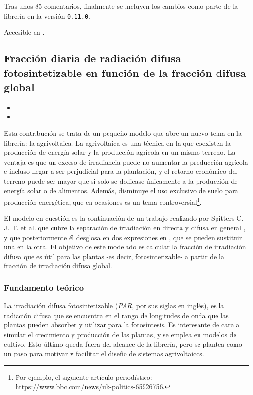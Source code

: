 Tras unos 85 comentarios, finalmente se incluyen los cambios como parte de la librería en la versión \texttt{0.11.0}.

Accesible en .

\subsection{Fracción diaria de radiación difusa fotosintetizable en función de la fracción difusa global}

\begin{itemize}
    \item {}
    \item {}
\end{itemize}

Esta contribución se trata de un pequeño modelo que abre un nuevo tema en la librería: la agrivoltaica. La agrivoltaica es una técnica en la que coexisten la producción de energía solar y la producción agrícola en un mismo terreno. La ventaja es que un exceso de irradiancia puede no aumentar la producción agrícola e incluso llegar a ser perjudicial para la plantación, y el retorno económico del terreno puede ser mayor que si solo se dedicase únicamente a la producción de energía solar o de alimentos. Además, disminuye el uso exclusivo de suelo para producción energética, que en ocasiones es un tema controversial\footnote{Por ejemplo, el siguiente artículo periodístico: \url{https://www.bbc.com/news/uk-politics-65926756}.}.

El modelo en cuestión es la continuación de un trabajo realizado por Spitters C. J. T. et al. que cubre la separación de irradiación en directa y difusa en general \cite{Spitters_Toussaint_Goudriaan_1986}, y que posteriormente él desglosa en dos expresiones en \cite{Spitters_1986}, que se pueden sustituir una en la otra. El objetivo de este modelado es calcular la fracción de irradiación difusa que es útil para las plantas -es decir, fotosintetizable- a partir de la fracción de irradiación difusa global.

\subsubsection{Fundamento teórico}

La irradiación difusa fotosintetizable (\textit{PAR}, por sus siglas en inglés), es la radiación difusa que se encuentra en el rango de longitudes de onda que las plantas pueden absorber y utilizar para la fotosíntesis. Es interesante de cara a simular el crecimiento y producción de las plantas, y se emplea en modelos de cultivo. Esto último queda fuera del alcance de la librería, pero se plantea como un paso para motivar y facilitar el diseño de sistemas agrivoltaicos.

